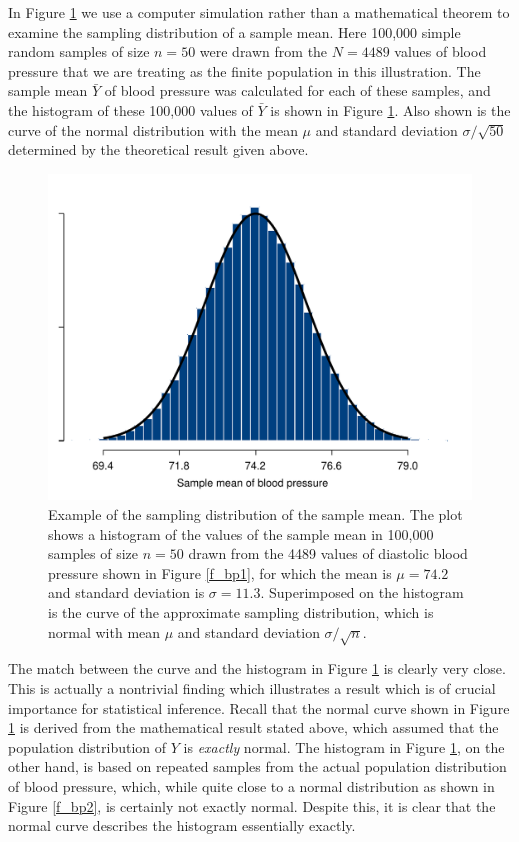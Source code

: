 In Figure \ref{f_sampld} we use a computer simulation rather than a
mathematical theorem to examine the sampling distribution of a sample
mean. Here 100,000 simple random samples of
size $n=50$ were drawn from the $N=4489$ values of blood
pressure that we are treating as the finite population in this
illustration. The sample mean $\bar{Y}$ of blood pressure was calculated
for each of these samples, and the histogram of these 100,000 values of
$\bar{Y}$ is shown in Figure \ref{f_sampld}. Also shown is the curve of
the normal distribution with the mean $\mu$ and standard deviation
$\sigma/\sqrt{50}$ determined by the theoretical result given above.

\begin{figure}[t]
\caption{Example of the sampling distribution of the sample mean. The
plot shows a histogram of the values of the sample mean in 100,000 samples
of size $n=50$ drawn from the 4489 values of diastolic blood pressure
shown in Figure \ref{f_bp1}, for which the mean is $\mu=74.2$ and
standard deviation is $\sigma=11.3$.
Superimposed on the histogram
is the curve of the approximate sampling
distribution, which is normal with mean $\mu$ and standard
deviation $\sigma/\sqrt{n}$.
}
\label{f_sampld}
\begin{center}

\includegraphics[width=12cm]{sampld1_bp}
\end{center}

\end{figure}

The match between the curve and the histogram in Figure \ref{f_sampld}
is clearly very close. This is actually a nontrivial finding which
illustrates a result which is of crucial importance for statistical
inference. Recall that the normal curve shown in Figure \ref{f_sampld}
is derived from the mathematical result stated above, which assumed that
the population distribution of $Y$ is \emph{exactly} normal. The
histogram in Figure \ref{f_sampld}, on the other hand, is based on
repeated samples from the actual population distribution of blood
pressure, which, while quite close to a normal distribution as shown in
Figure \ref{f_bp2}, is certainly not exactly normal. Despite this, it is
clear that the normal curve describes the histogram essentially exactly.

